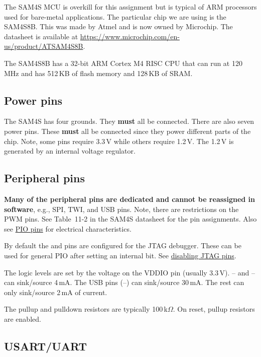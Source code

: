The SAM4S MCU is overkill for this assignment but is typical of ARM
processors used for bare-metal applications.  The particular chip we
are using is the SAM4S8B.  This was made by Atmel and is now owned by
Microchip.  The datasheet is available
at \url{https://www.microchip.com/en-us/product/ATSAM4S8B}.

The SAM4S8B has a 32-bit ARM Cortex M4 RISC CPU that can run at
120\,MHz and has 512\,KB of flash memory and 128\,KB of SRAM.


\subsection{Power pins}\label{power-pins}

The SAM4S has four grounds. They \textbf{must} all be connected. There
are also seven power pins. These \textbf{must} all be connected since
they power different parts of the chip. Note, some pins require 3.3\,V
while others require 1.2\,V. The 1.2\,V is generated by an internal
voltage regulator.


\subsection{Peripheral pins}\label{peripheral-pins}

\textbf{Many of the peripheral pins are dedicated and cannot be
  reassigned in software}, e.g., SPI, TWI, and USB pins. Note, there
are restrictions on the PWM pins.  See Table~11-2 in the SAM4S
datasheet for the pin assignments.  Also see \hyperref[PIO pins] {PIO
  pins} for electrical characteristics.

By default the  and  pins are configured for the
JTAG debugger.  These can be used for general PIO after setting an
internal bit.  See \protect\hyperref[disabling-jtag-pins]{disabling
JTAG pins}.

The logic levels are set by the voltage on the VDDIO pin (usually
3.3\,V).  -- and -- can
sink/source 4\,mA.  The USB pins (--) can
sink/source 30\,mA.  The rest can only sink/source 2\,mA of current.

The pullup and pulldown resistors are typically 100\,k$\Omega$.  On
reset, pullup resistors are enabled.


\subsection{USART/UART}\label{usartuart}

